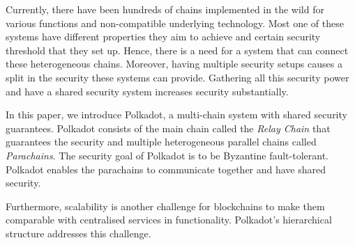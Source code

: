Currently, there have been hundreds of chains implemented in the wild for various functions and non-compatible underlying technology.
Most one of these systems have different properties they aim to achieve and certain security threshold that they set up.
Hence, there is a need for a system that can connect these heterogeneous chains.
Moreover, having multiple security setups causes a split in the security these systems can provide. Gathering all this security power and have a shared security system increases security substantially.

In this paper, we introduce Polkadot, a multi-chain system with shared security guarantees.
Polkadot consists of the main chain called the \emph{Relay Chain} that guarantees the security and multiple heterogeneous parallel chains called \emph{Parachains}.
The security goal of Polkadot is to be Byzantine fault-tolerant. Polkadot enables the parachains to communicate together and have shared security.

Furthermore, scalability is another challenge for blockchains to make them comparable with centralised services in functionality.
Polkadot's hierarchical structure addresses this challenge.
